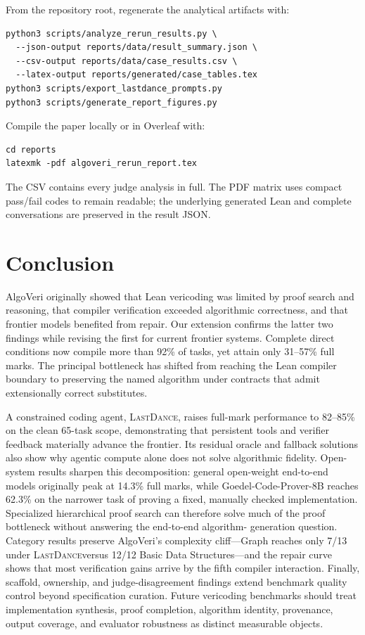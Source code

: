 \documentclass{article}
\newcommand{\lastdance}{\textsc{LastDance}}
\begin{document}
From the repository root, regenerate the analytical artifacts with:

\begin{lstlisting}
python3 scripts/analyze_rerun_results.py \
  --json-output reports/data/result_summary.json \
  --csv-output reports/data/case_results.csv \
  --latex-output reports/generated/case_tables.tex
python3 scripts/export_lastdance_prompts.py
python3 scripts/generate_report_figures.py
\end{lstlisting}

Compile the paper locally or in Overleaf with:

\begin{lstlisting}
cd reports
latexmk -pdf algoveri_rerun_report.tex
\end{lstlisting}

The CSV contains every judge analysis in full.  The PDF matrix uses compact pass/fail
codes to remain readable; the underlying generated Lean and complete conversations are
preserved in the result JSON.

\section{Conclusion}

AlgoVeri originally showed that Lean vericoding was limited by proof search and
reasoning, that compiler verification exceeded algorithmic correctness, and that
frontier models benefited from repair.  Our extension confirms the latter two findings
while revising the first for current frontier systems.  Complete direct conditions now
compile more than 92\% of tasks, yet attain only 31--57\% full marks.  The principal
bottleneck has shifted from reaching the Lean compiler boundary to preserving the named
algorithm under contracts that admit extensionally correct substitutes.

A constrained coding agent, \lastdance, raises full-mark performance to 82--85\% on the clean
65-task scope, demonstrating that persistent tools and verifier feedback materially
advance the frontier.  Its residual oracle and fallback solutions also show why agentic
compute alone does not solve algorithmic fidelity.  Open-system results sharpen this
decomposition: general open-weight end-to-end models originally peak at 14.3\% full
marks, while Goedel-Code-Prover-8B reaches 62.3\% on the narrower task of proving a
fixed, manually checked implementation.  Specialized hierarchical proof search can
therefore solve much of the proof bottleneck without answering the end-to-end algorithm-
generation question.  Category results preserve AlgoVeri's complexity cliff---Graph
reaches only 7/13 under \lastdance versus 12/12 Basic Data Structures---and the repair
curve shows that most verification gains arrive by the fifth compiler interaction.
Finally, scaffold, ownership, and judge-disagreement findings
extend benchmark quality control beyond specification curation.  Future vericoding
benchmarks should treat implementation synthesis, proof completion, algorithm identity,
provenance, output coverage, and evaluator robustness as distinct measurable objects.
\end{document}
